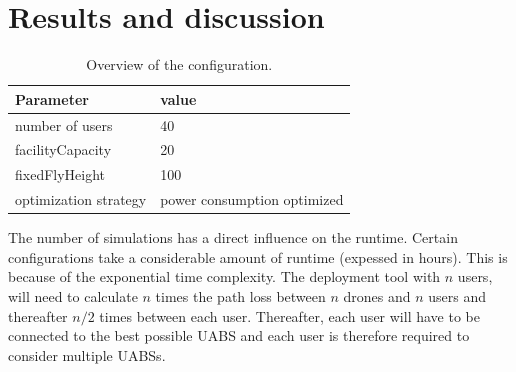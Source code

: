 \chapter{Results and discussion}
\label{chap:results}
\iffalse %
\begin{table}[!htb]
\centering
  \begin{tabular}{|l|l|}
  \hline
  Parameter               & value          \\   \hline 
  number of users               & 40            \\ 
  facilityCapacity                    & 20           \\ 
  fixedFlyHeight               & 100           \\ 
  optimization strategy               & power consumption optimized           \\ 
  \hline
  \end{tabular}
  \caption{Overview of the configuration.}
  \label{table:confOverviewScenario2}
\end{table}

The number of simulations has a direct influence on the runtime. Certain configurations take a considerable amount of runtime (expessed in hours). This is because of the
exponential time complexity. The deployment tool with $n$ users, will need to calculate $n$ times the path loss between $n$ drones and $n$ users and thereafter $n/2$ times between
each user. Thereafter, each user will have to be connected to the best possible \gls{UABS} and each user is therefore required to consider multiple \gls{UABS}s.

